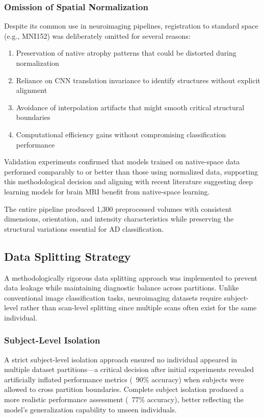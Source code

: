 \documentclass[12pt, a4paper]{article}
\begin{document}
\subsubsection{Omission of Spatial Normalization}

Despite its common use in neuroimaging pipelines, registration to standard space (e.g., MNI152) was deliberately omitted for several reasons:
\begin{enumerate}
    \item Preservation of native atrophy patterns that could be distorted during normalization
    \item Reliance on CNN translation invariance to identify structures without explicit alignment
    \item Avoidance of interpolation artifacts that might smooth critical structural boundaries
    \item Computational efficiency gains without compromising classification performance
\end{enumerate}

Validation experiments confirmed that models trained on native-space data performed comparably to or better than those using normalized data, supporting this methodological decision and aligning with recent literature suggesting deep learning models for brain MRI benefit from native-space learning.

The entire pipeline produced 1,300 preprocessed volumes with consistent dimensions, orientation, and intensity characteristics while preserving the structural variations essential for AD classification.

\subsection{Data Splitting Strategy}

A methodologically rigorous data splitting approach was implemented to prevent data leakage while maintaining diagnostic balance across partitions. Unlike conventional image classification tasks, neuroimaging datasets require subject-level rather than scan-level splitting since multiple scans often exist for the same individual.

\subsubsection{Subject-Level Isolation}

A strict subject-level isolation approach ensured no individual appeared in multiple dataset partitions—a critical decision after initial experiments revealed artificially inflated performance metrics (~90\% accuracy) when subjects were allowed to cross partition boundaries. Complete subject isolation produced a more realistic performance assessment (~77\% accuracy), better reflecting the model's generalization capability to unseen individuals.
\end{document}
